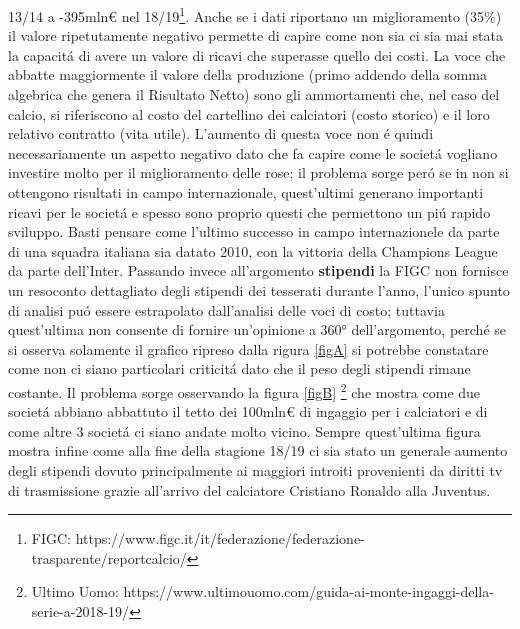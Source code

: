 \documentclass[
    corpo=12pt,
    oneside,
    evenboxes,
    tipotesi=triennale,
    stile=classica,
    oldstyle,
    autoretitolo,
    greek,
]{toptesi}
\begin{document}
\begin{interlinea}{1.5}
13/14 a -395mln€ nel 18/19\footnote{FIGC: https://www.figc.it/it/federazione/federazione-trasparente/reportcalcio/}. 
Anche se i dati riportano un miglioramento (35\%) il valore ripetutamente negativo permette di capire come non
sia ci sia mai stata la capacit\'a di avere un valore di ricavi che superasse quello dei costi. La voce che abbatte maggiormente il valore 
della produzione (primo addendo della somma algebrica che genera il Risultato Netto) sono gli ammortamenti che, nel caso del calcio, 
si riferiscono al costo del cartellino dei calciatori (costo storico) e il loro relativo contratto (vita utile). L'aumento di questa voce
non \'e quindi necessariamente un aspetto negativo dato che fa capire come le societ\'a vogliano investire molto per il miglioramento delle
rose; il problema sorge per\'o se in non si ottengono risultati in campo internazionale, quest'ultimi generano importanti 
ricavi per le societ\'a e spesso sono proprio questi che permettono un pi\'u rapido sviluppo. Basti pensare come l'ultimo successo in campo 
internazionele da parte di una squadra italiana sia datato 2010, con la vittoria della Champions League da parte dell'Inter.\newline
Passando invece all'argomento \textbf{stipendi} la FIGC non fornisce un resoconto dettagliato degli stipendi dei tesserati durante l'anno, 
l'unico spunto di analisi pu\'o essere estrapolato dall'analisi delle voci di costo; tuttavia quest'ultima non consente di fornire 
un'opinione a 360° dell'argomento, perch\'e se si osserva solamente il grafico ripreso dalla rigura \ref{figA} si potrebbe constatare come
non ci siano particolari criticit\'a dato che il peso degli stipendi rimane costante. Il problema sorge osservando la figura \ref{figB}
\footnote{Ultimo Uomo: https://www.ultimouomo.com/guida-ai-monte-ingaggi-della-serie-a-2018-19/} che mostra come due societ\'a abbiano
abbattuto il tetto dei 100mln€ di ingaggio per i calciatori e di come altre 3 societ\'a ci siano andate molto vicino. Sempre quest'ultima
figura mostra infine come alla fine della stagione 18/19 ci sia stato un generale aumento degli stipendi dovuto principalmente ai maggiori
introiti provenienti da diritti tv di trasmissione grazie all'arrivo del calciatore Cristiano Ronaldo alla Juventus.\newline
\begin{figure}
    \centering
     \quad

\end{figure}
\end{interlinea}
\end{document}
